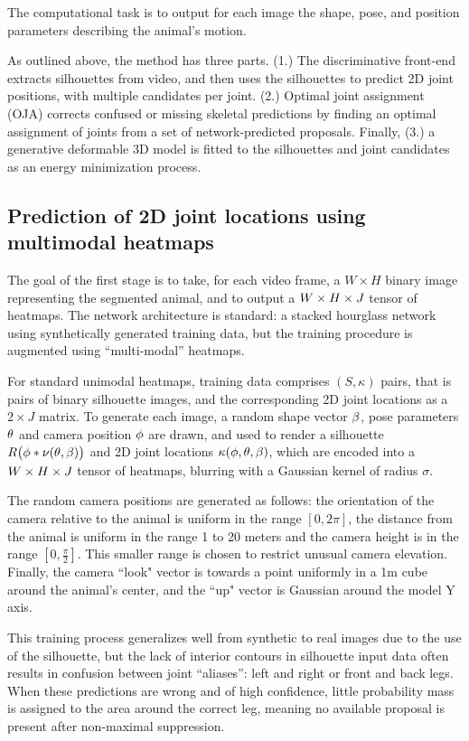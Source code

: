 The computational task is to output for each image the shape,  pose, and position parameters describing the animal's motion.

As outlined above, the method has three parts.  
(1.) The discriminative front-end extracts silhouettes from video, and then uses the silhouettes to predict 2D joint positions, with multiple candidates per joint. 
(2.) Optimal joint assignment (OJA) corrects confused or missing skeletal predictions by finding an optimal assignment of joints from a set of network-predicted proposals. Finally, (3.) a generative deformable 3D model is fitted to the silhouettes and joint candidates as an energy minimization process.

\subsection{Prediction of 2D joint locations using multimodal heatmaps}
The goal of the first stage is to take, for each video frame, a $W\times H$ binary image representing the segmented animal, and to output a $W \times H \times J$ tensor of heatmaps. The network architecture is standard: a stacked hourglass network~\cite{newell2016stacked} using synthetically generated training data, but the training procedure is augmented using ``multi-modal'' heatmaps. 

For standard unimodal heatmaps, training data comprises $(S, \kappa)$ pairs, that is pairs of binary silhouette images, and the corresponding 2D joint locations as a $2\times J$ matrix.  To generate each image, a random shape vector $\beta$, pose parameters $\theta$ and camera position $\phi$ are drawn, and used to render a silhouette $R\bigl(\phi * \nu(\theta, \beta)\bigr)$ and 2D joint locations $\kappa(\phi,\theta,\beta)$, which are encoded into a $W \times H \times J$ tensor of heatmaps, blurring with a Gaussian kernel of radius $\sigma$. 

The random camera positions are generated as follows: the orientation of the camera relative to the animal is uniform in the range $[0, 2\pi]$, the distance from the animal is uniform in the range 1 to 20 meters and the camera height is in the range $[0,\frac{\pi}{2}]$. This smaller range is chosen to restrict unusual camera elevation. Finally, the camera ``look" vector is towards a point uniformly in a 1m cube around the animal's center, and the ``up" vector is Gaussian around the model Y axis.  

This training process generalizes well from synthetic to real images due to the use of the silhouette, but the lack of interior contours in silhouette input data often results in confusion between joint ``aliases'': left and right or front and back legs.  When these predictions are wrong and of high confidence, little probability mass is assigned to the area around the correct leg, meaning no available proposal is present after non-maximal suppression.

